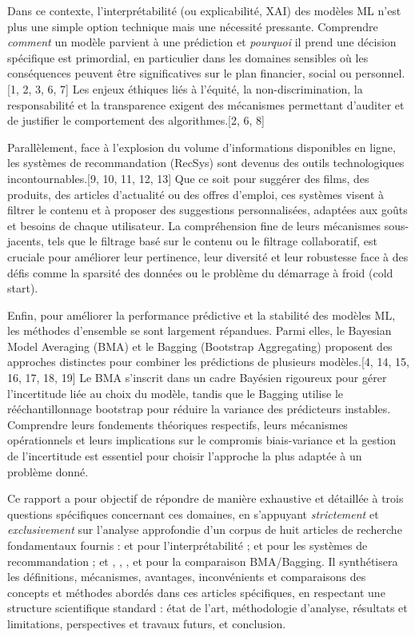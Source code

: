 \documentclass[11pt,a4paper]{article}
\begin{document}
Dans ce contexte, l'interprétabilité (ou explicabilité, XAI) des modèles ML n'est plus une simple option technique mais une nécessité pressante. Comprendre \textit{comment} un modèle parvient à une prédiction et \textit{pourquoi} il prend une décision spécifique est primordial, en particulier dans les domaines sensibles où les conséquences peuvent être significatives sur le plan financier, social ou personnel.[1, 2, 3, 6, 7] Les enjeux éthiques liés à l'équité, la non-discrimination, la responsabilité et la transparence exigent des mécanismes permettant d'auditer et de justifier le comportement des algorithmes.[2, 6, 8]

Parallèlement, face à l'explosion du volume d'informations disponibles en ligne, les systèmes de recommandation (RecSys) sont devenus des outils technologiques incontournables.[9, 10, 11, 12, 13] Que ce soit pour suggérer des films, des produits, des articles d'actualité ou des offres d'emploi, ces systèmes visent à filtrer le contenu et à proposer des suggestions personnalisées, adaptées aux goûts et besoins de chaque utilisateur. La compréhension fine de leurs mécanismes sous-jacents, tels que le filtrage basé sur le contenu ou le filtrage collaboratif, est cruciale pour améliorer leur pertinence, leur diversité et leur robustesse face à des défis comme la sparsité des données ou le problème du démarrage à froid (cold start).

Enfin, pour améliorer la performance prédictive et la stabilité des modèles ML, les méthodes d'ensemble se sont largement répandues. Parmi elles, le Bayesian Model Averaging (BMA) et le Bagging (Bootstrap Aggregating) proposent des approches distinctes pour combiner les prédictions de plusieurs modèles.[4, 14, 15, 16, 17, 18, 19] Le BMA s'inscrit dans un cadre Bayésien rigoureux pour gérer l'incertitude liée au choix du modèle, tandis que le Bagging utilise le rééchantillonnage bootstrap pour réduire la variance des prédicteurs instables. Comprendre leurs fondements théoriques respectifs, leurs mécanismes opérationnels et leurs implications sur le compromis biais-variance et la gestion de l'incertitude est essentiel pour choisir l'approche la plus adaptée à un problème donné.

Ce rapport a pour objectif de répondre de manière exhaustive et détaillée à trois questions spécifiques concernant ces domaines, en s'appuyant \textit{strictement} et \textit{exclusivement} sur l'analyse approfondie d'un corpus de huit articles de recherche fondamentaux fournis : \citet{Doran2017} et \citet{Burkart2021} pour l'interprétabilité ; \citet{Ko2022} et \citet{Koren2011} pour les systèmes de recommandation ; et \citet{Wasserman2000}, \citet{Domingos1997}, \citet{Domingos2012}, et \citet{Solomonoff1964} pour la comparaison BMA/Bagging. Il synthétisera les définitions, mécanismes, avantages, inconvénients et comparaisons des concepts et méthodes abordés dans ces articles spécifiques, en respectant une structure scientifique standard : état de l'art, méthodologie d'analyse, résultats et limitations, perspectives et travaux futurs, et conclusion.
\end{document}
